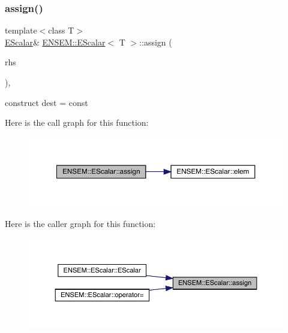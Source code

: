 \subsubsection{\texorpdfstring{assign()}{assign()}\hspace{0.1cm}{\footnotesize\ttfamily [1/6]}}
{\footnotesize\ttfamily template$<$class T$>$ \\
\mbox{\hyperlink{classENSEM_1_1EScalar}{E\+Scalar}}\& \mbox{\hyperlink{classENSEM_1_1EScalar}{E\+N\+S\+E\+M\+::\+E\+Scalar}}$<$ T $>$\+::assign (\begin{DoxyParamCaption}\item[{const typename \mbox{\hyperlink{structENSEM_1_1WordType}{Word\+Type}}$<$ T $>$\+::Type\+\_\+t \&}]{rhs }\end{DoxyParamCaption})\hspace{0.3cm}{\ttfamily [inline]}, {\ttfamily [protected]}}



construct dest = const 

Here is the call graph for this function\+:
\nopagebreak
\begin{figure}[H]
\begin{center}
\leavevmode
\includegraphics[width=350pt]{d0/d82/classENSEM_1_1EScalar_a9b88ad4d69d05f69b6483701487ddb74_cgraph}
\end{center}
\end{figure}
Here is the caller graph for this function\+:\nopagebreak
\begin{figure}[H]
\begin{center}
\leavevmode
\includegraphics[width=350pt]{d0/d82/classENSEM_1_1EScalar_a9b88ad4d69d05f69b6483701487ddb74_icgraph}
\end{center}
\end{figure}
\mbox{\label{classENSEM_1_1EScalar_a9b88ad4d69d05f69b6483701487ddb74}} 
